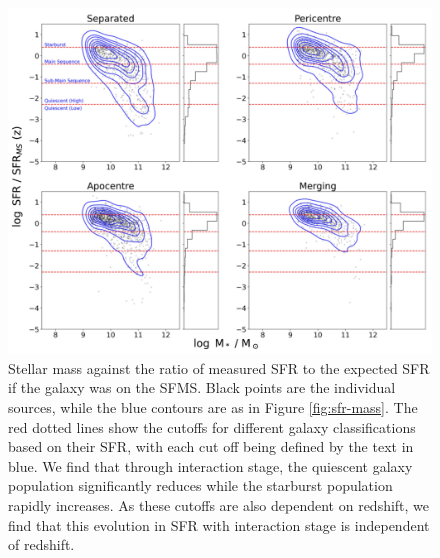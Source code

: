 \begin{figure}
    \centering
    \includegraphics[width=\textwidth]{Chapter3/figures/sfr-clsf-dist.pdf}
    \caption[Stellar mass against the ratio of measured SFR to the expected SFR if the galaxy was on the SFMS.]{Stellar mass against the ratio of measured SFR to the expected SFR if the galaxy was on the SFMS. Black points are the individual sources, while the blue contours are as in Figure \ref{fig:sfr-mass}. The red dotted lines show the cutoffs for different galaxy classifications based on their SFR, with each cut off being defined by the text in blue. We find that through interaction stage, the quiescent galaxy population significantly reduces while the starburst population rapidly increases. As these cutoffs are also dependent on redshift, we find that this evolution in SFR with interaction stage is independent of redshift.}
    \label{fig:sfr-clsf}
\end{figure}

